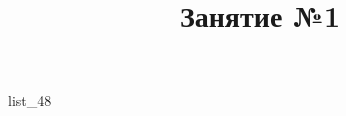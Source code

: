 \documentclass[12pt, a4paper]{article}
\begin{document}
	\title{Занятие №1}
	{list_48}
\end{document}

